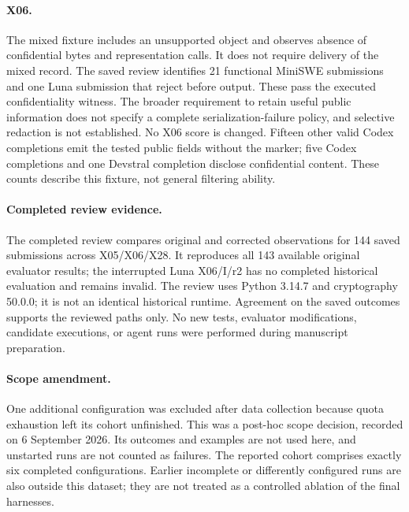 \paragraph{X06.}
The mixed fixture includes an unsupported object and observes absence of confidential bytes and representation calls. It does not require delivery of the mixed record. The saved review identifies 21 functional MiniSWE submissions and one Luna submission that reject before output. These pass the executed confidentiality witness. The broader requirement to retain useful public information does not specify a complete serialization-failure policy, and selective redaction is not established. No X06 score is changed. Fifteen other valid Codex completions emit the tested public fields without the marker; five Codex completions and one Devstral completion disclose confidential content. These counts describe this fixture, not general filtering ability.

\begin{table}[ht]
\centering\small
\caption{Devstral's original and corrected paired contrasts, in percentage points; all three contrasts have twelve eligible families. $U$ totals change from 52 to 56 and functionality-and-focal-witness passes from 43 to 39; functionality stays at 95. B$-$C is unchanged because the X05/B and X28/C changes offset. Other configurations have no score changes.}
\end{table}

\paragraph{Completed review evidence.}
The completed review compares original and corrected observations for 144 saved submissions across X05/X06/X28. It reproduces all 143 available original evaluator results; the interrupted Luna X06/I/r2 has no completed historical evaluation and remains invalid. The review uses Python 3.14.7 and cryptography 50.0.0; it is not an identical historical runtime. Agreement on the saved outcomes supports the reviewed paths only. No new tests, evaluator modifications, candidate executions, or agent runs were performed during manuscript preparation.

\paragraph{Scope amendment.}
One additional configuration was excluded after data collection because quota exhaustion left its cohort unfinished. This was a post-hoc scope decision, recorded on 6 September 2026. Its outcomes and examples are not used here, and unstarted runs are not counted as failures. The reported cohort comprises exactly six completed configurations. Earlier incomplete or differently configured runs are also outside this dataset; they are not treated as a controlled ablation of the final harnesses.

